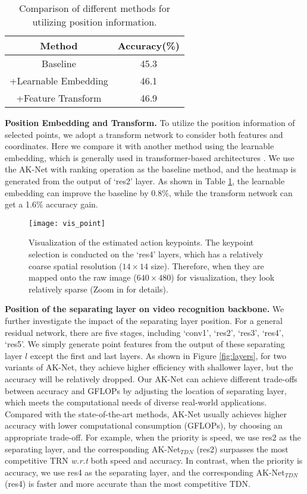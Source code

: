 \documentclass[journal]{IEEEtran}
\begin{document}
\begin{table}[ht]
    \centering
    \caption{Comparison of different methods for utilizing position information.}
    \label{tab:position}
    \begin{tabular}{cc} \hline
        Method & Accuracy(\%) \\ \hline
        Baseline & 45.3 \\
        +Learnable Embedding & 46.1 \\
        +Feature Transform & 46.9 \\ \hline
    \end{tabular}
\end{table}

\textbf{Position Embedding and Transform.}
To utilize the position information of selected points, we adopt a transform network to consider both features and coordinates.
Here we compare it with another method using the learnable embedding, which is generally used in transformer-based architectures \cite{bertasius2021space, liu2021video}.
We use the AK-Net with ranking operation as the baseline method, and the heatmap is generated from the output of `res2' layer.
As shown in Table \ref{tab:position}, the learnable embedding can improve the baseline by 0.8\%, while the transform network can get a 1.6\% accuracy gain.


\begin{figure*}
    \centering
    \texttt{[image: vis\_point]}
    \caption{
    Visualization of the estimated action keypoints.
    The keypoint selection is conducted on the `res4' layers, which has a relatively coarse spatial resolution ($14\times 14$ size). Therefore, when they are  mapped onto the raw image ($640\times 480$) for visualization, they look relatively sparse
(Zoom in for details).
    }
    \label{fig:vis_point}
\end{figure*}

\textbf{Position of the separating layer on video recognition backbone.}
We further investigate the impact of the separating layer position.
For a general residual network, there are five stages, including `conv1', `res2', `res3', `res4', `res5'.
We simply generate point features from the output of these separating layer $l$ except the first and last layers.
As shown in Figure \ref{fig:layers}, for two variants of AK-Net, they achieve higher efficiency with shallower layer, but the accuracy will be relatively dropped.
Our AK-Net can achieve different trade-offs between accuracy and GFLOPs by adjusting the location of separating layer, which meets the computational needs of diverse real-world applications.
Compared with the state-of-the-art methods, AK-Net usually achieves higher accuracy with lower computational consumption (GFLOPs), by choosing an appropriate trade-off. 
For example, when the priority is speed, we use res2 as the separating layer, and the corresponding AK-Net$_{TDN}$ (res2) surpasses the most competitive TRN \emph{w.r.t} both speed and accuracy. 
In contrast, when the priority is accuracy, we use res4 as the separating layer, and the corresponding AK-Net$_{TDN}$ (res4) is faster and more accurate than the most competitive TDN. 
\end{document}
